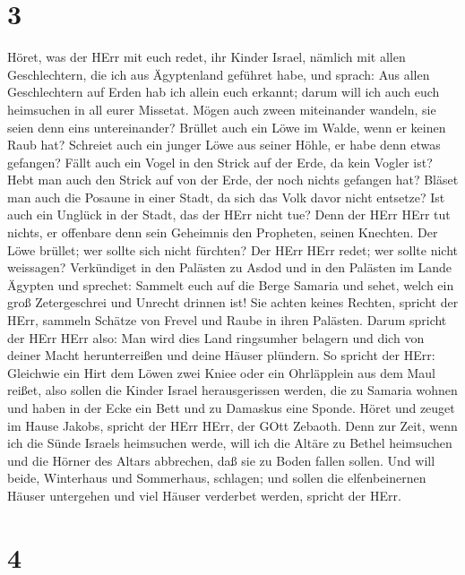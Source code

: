 \hypertarget{section-2}{%
\section{3}\label{section-2}}

 Höret, was der HErr mit euch redet, ihr Kinder Israel,
nämlich mit allen Geschlechtern, die ich aus Ägyptenland geführet habe,
und sprach:  Aus allen Geschlechtern auf Erden hab ich
allein euch erkannt; darum will ich auch euch heimsuchen in all eurer
Missetat.  Mögen auch zween miteinander wandeln, sie seien
denn eins untereinander?  Brüllet auch ein Löwe im Walde,
wenn er keinen Raub hat? Schreiet auch ein junger Löwe aus seiner Höhle,
er habe denn etwas gefangen?  Fällt auch ein Vogel in den
Strick auf der Erde, da kein Vogler ist? Hebt man auch den Strick auf
von der Erde, der noch nichts gefangen hat?  Bläset man auch
die Posaune in einer Stadt, da sich das Volk davor nicht entsetze? Ist
auch ein Unglück in der Stadt, das der HErr nicht tue?  Denn
der HErr HErr tut nichts, er offenbare denn sein Geheimnis den
Propheten, seinen Knechten.  Der Löwe brüllet; wer sollte
sich nicht fürchten? Der HErr HErr redet; wer sollte nicht weissagen?
 Verkündiget in den Palästen zu Asdod und in den Palästen im
Lande Ägypten und sprechet: Sammelt euch auf die Berge Samaria und
sehet, welch ein groß Zetergeschrei und Unrecht drinnen ist!
 Sie achten keines Rechten, spricht der HErr, sammeln
Schätze von Frevel und Raube in ihren Palästen.  Darum
spricht der HErr HErr also: Man wird dies Land ringsumher belagern und
dich von deiner Macht herunterreißen und deine Häuser plündern.
 So spricht der HErr: Gleichwie ein Hirt dem Löwen zwei
Kniee oder ein Ohrläpplein aus dem Maul reißet, also sollen die Kinder
Israel herausgerissen werden, die zu Samaria wohnen und haben in der
Ecke ein Bett und zu Damaskus eine Sponde.  Höret und
zeuget im Hause Jakobs, spricht der HErr HErr, der GOtt Zebaoth.
 Denn zur Zeit, wenn ich die Sünde Israels heimsuchen
werde, will ich die Altäre zu Bethel heimsuchen und die Hörner des
Altars abbrechen, daß sie zu Boden fallen sollen.  Und will
beide, Winterhaus und Sommerhaus, schlagen; und sollen die
elfenbeinernen Häuser untergehen und viel Häuser verderbet werden,
spricht der HErr.

\hypertarget{section-3}{%
\section{4}\label{section-3}}

